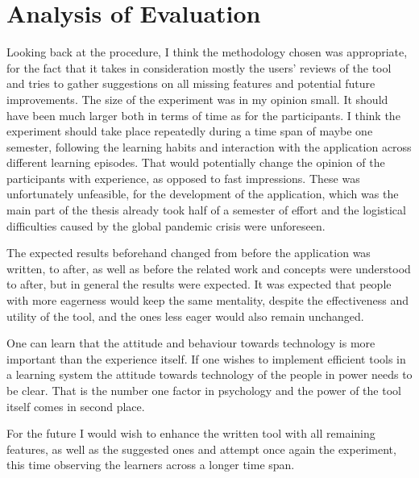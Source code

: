 \section{Analysis of Evaluation}

Looking back at the procedure, I think the methodology chosen was appropriate, for the fact that it takes
in consideration mostly the users' reviews of the tool and tries to gather suggestions on all missing 
features and potential future improvements. The size of the experiment was in my opinion small. It should
have been much larger both in terms of time as for the participants. I think the experiment should take
place repeatedly during a time span of maybe one semester, following the learning habits and interaction
with the application across different learning episodes. That would potentially change the opinion of the
participants with experience, as opposed to fast impressions. These was unfortunately unfeasible, for the
development of the application, which was the main part of the thesis already took half of a semester of
effort and the logistical difficulties caused by the global pandemic crisis were unforeseen. 

The expected results beforehand changed from before the application was written, to after, as well as 
before the related work and concepts were understood to after, but in general the results were expected.
It was expected that people with more eagerness would keep the same mentality, despite the effectiveness
and utility of the tool, and the ones less eager would also remain unchanged. 

One can learn that the attitude and behaviour towards technology is more important than the experience 
itself. If one wishes to implement efficient tools in a learning system the attitude towards technology 
of the people in power needs to be clear. That is the number one factor in psychology and the power of 
the tool itself comes in second place.

For the future I would wish to enhance the written tool with all remaining features, as well as the
suggested ones and attempt once again the experiment, this time observing the learners across a longer
time span. 

